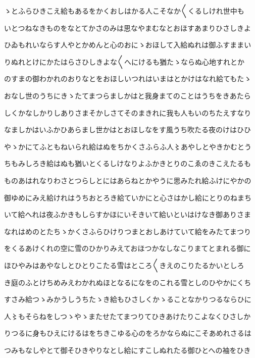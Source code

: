 \documentclass[a4paper,11pt,landscape]{ltjtarticle}
\begin{document}
\par\medskip
ゝとふらひきこえ給もあるをかくおしはかる人こそなか〱くるしけれ世中も
\par\medskip
いとつねなきものをなとてかさのみは思なやまむなとおほすあまりひさしきよ
\par\medskip
ひゐもれいならす人やとかめんと心のおにゝおほして入給ぬれは御ふすままい
\par\medskip
りぬれとけにかたはらさひしきよな〱へにけるも猶たゝならぬ心地すれとか
\par\medskip
のすまの御わかれのおりなとをおほしいつれはいまはとかけはなれ給てもたゝ
\par\medskip
おなし世のうちにきゝたてまつらましかはと我身まてのことはうちをきあたら
\par\medskip
しくかなしかりしありさまそかしさてそのまきれに我も人もいのちたえすなり
\par\medskip
なましかはいふかひあらまし世かはとおほしなをす風うち吹たる夜のけはひひ
\par\medskip
やゝかにてふともねいられ給はぬをちかくさふらふ人〻あやしとやきかむとう
\par\medskip
ちもみしろき給はぬも猶いとくるしけなりよふかきとりのこゑのきこえたるも
\par\medskip
ものあはれなりわさとつらしとにはあらねとかやうに思みたれ給ふけにやかの
\par\medskip
御ゆめにみえ給けれはうちおとろき給ていかにと心さはかし給にとりのねまち
\par\medskip
いて給へれは夜ふかきもしらすかほにいそきいて給いといはけなき御ありさま
\par\medskip
なれはめのとたちゝかくさふらひけりつまとおしあけていて給をみたてまつり
\par\medskip
をくるあけくれの空に雪のひかりみえておほつかなしなこりまてとまれる御に
\par\medskip
ほひやみはあやなしとひとりこたる雪はところ〱きえのこりたるかいとしろ
\par\medskip
き庭のふとけちめみえわかれぬほとなるになをのこれる雪としのひやかにくち
\par\medskip
すさみ給つゝみかうしうちたゝき給もひさしくかゝることなかりつるならひに
\par\medskip
人〻もそらねをしつゝやゝまたせたてまつりてひきあけたりこよなくひさしか
\par\medskip
りつるに身もひえにけるはをちきこゆる心のをろかならぬにこそあめれさるは
\par\medskip
つみもなしやとて御そひきやりなとし給にすこしぬれたる御ひとへの袖をひき
\par\medskip
\end{document}
